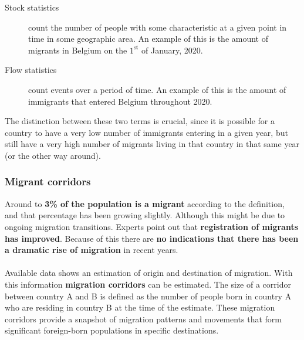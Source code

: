 \documentclass[../summary.tex]{subfiles}
\begin{document}
\begin{description}
	\item[Stock statistics] count the number of people with some characteristic at a given point in time in some geographic area. An example of this is the amount of migrants in Belgium on the $\mathrm{1^{st}}$ of January, 2020.
	\item[Flow statistics] count events over a period of time. An example of this is the amount of immigrants that entered Belgium throughout 2020.
\end{description}
The distinction between these two terms is crucial, since it is possible for a country to have a very low number of immigrants entering in a given year, but still have a very high number of migrants living in that country in that same year (or the other way around).

\subsubsection{Migrant corridors}
Around to \textbf{3\% of the population is a migrant} according to the definition, and that percentage has been growing slightly. Although this might be due to ongoing migration transitions. Experts point out that \textbf{registration of migrants has improved}. Because of this there are \textbf{no indications that there has been a dramatic rise of migration} in recent years.
\\\\
Available data shows an estimation of origin and destination of migration. With this information \textbf{migration corridors} can be estimated. The size of a corridor between country A and B is defined as the number of people born in country A who are residing in country B at the time of the estimate. These migration corridors provide a snapshot of migration patterns and movements that form significant foreign-born populations in specific destinations.
\end{document}
